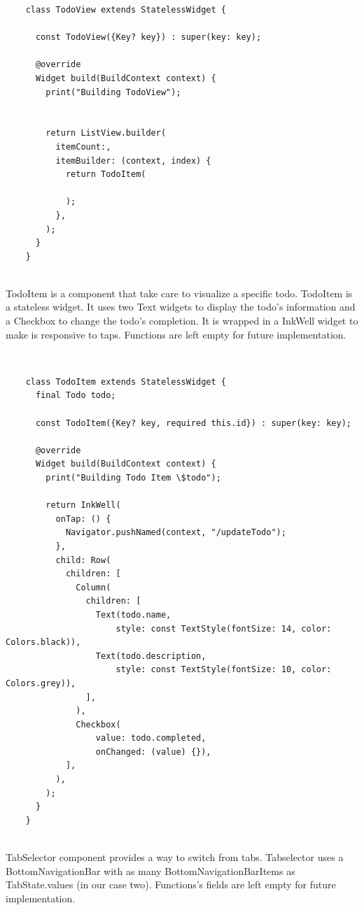 	 \mbox{}
	\begin{verbatim}
	class TodoView extends StatelessWidget {
	
	  const TodoView({Key? key}) : super(key: key);
	
	  @override
	  Widget build(BuildContext context) {
	    print("Building TodoView");
	
	
	    return ListView.builder(
	      itemCount:,
	      itemBuilder: (context, index) {
	        return TodoItem(
	          
	        );
	      },
	    );
	  }
	}
	
	\end{verbatim}
	
	\mbox{}
	
	
	TodoItem is a component that take care to visualize a specific todo. TodoItem is a stateless widget. It uses two Text widgets to display the todo's information and a Checkbox to change the todo’s completion. It is wrapped in a InkWell widget to make is responsive to taps. Functions are left empty for future implementation.
	
	\mbox{}\\
	
	 \mbox{}
	\begin{verbatim}
	class TodoItem extends StatelessWidget {
	  final Todo todo;
	
	  const TodoItem({Key? key, required this.id}) : super(key: key);
	
	  @override
	  Widget build(BuildContext context) {
	    print("Building Todo Item \$todo");
	
	    return InkWell(
	      onTap: () {
	        Navigator.pushNamed(context, "/updateTodo");
	      },
	      child: Row(
	        children: [
	          Column(
	            children: [
	              Text(todo.name,
	                  style: const TextStyle(fontSize: 14, color: Colors.black)),
	              Text(todo.description,
	                  style: const TextStyle(fontSize: 10, color: Colors.grey)),
	            ],
	          ),
	          Checkbox(
	              value: todo.completed,
	              onChanged: (value) {}),
	        ],
	      ),
	    );
	  }
	}
	
	\end{verbatim}
	
	\mbox{}
	
	
	TabSelector component provides a way to switch from tabs. Tabselector uses a BottomNavigationBar with as many BottomNavigationBarItems as TabState.values (in our case two). Functions's fields are left empty for future implementation.
	
